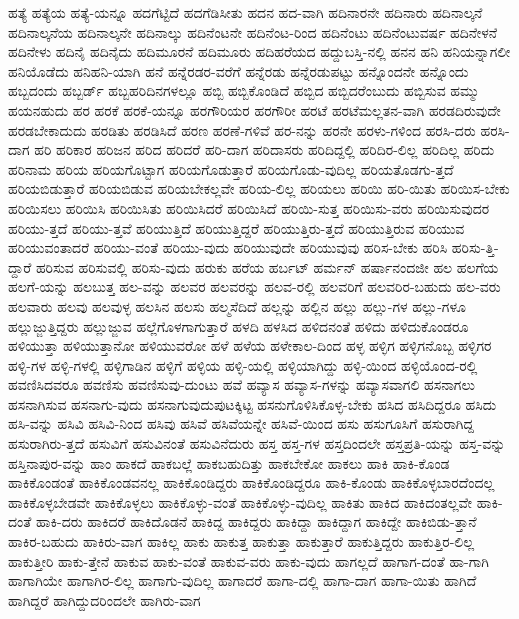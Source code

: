 {ಹತ್ಯೆ
ಹತ್ಯೆಯ
ಹತ್ಯೆ-ಯನ್ನೂ
ಹದಗೆಟ್ಟಿದೆ
ಹದಗೆಡಿಸೀತು
ಹದನ
ಹದ-ವಾಗಿ
ಹದಿನಾರನೇ
ಹದಿನಾರು
ಹದಿನಾಲ್ಕನೆ
ಹದಿನಾಲ್ಕನೆಯ
ಹದಿನಾಲ್ಕನೇ
ಹದಿನಾಲ್ಕು
ಹದಿನೆಂಟನೇ
ಹದಿನೆಂಟ-ರಿಂದ
ಹದಿನೆಂಟು
ಹದಿನೆಂಟುವರ್ಷ
ಹದಿನೇಳನೆ
ಹದಿನೇಳು
ಹದಿನೈ
ಹದಿನೈದು
ಹದಿಮೂರನೆ
ಹದಿಮೂರು
ಹದಿಹರೆಯದ
ಹದ್ದುಬಸ್ತಿ-ನಲ್ಲಿ
ಹನನ
ಹನಿ
ಹನಿಯನ್ನಾಗಲೀ
ಹನಿಯೊಡೆದು
ಹನಿಹನಿ-ಯಾಗಿ
ಹನೆ
ಹನ್ನೆರಡರ-ವರೆಗೆ
ಹನ್ನೆರಡು
ಹನ್ನೆರಡುಪಟ್ಟು
ಹನ್ನೊಂದನೇ
ಹನ್ನೊಂದು
ಹಬ್ಬದಂದು
ಹಬ್ಬರ್ಡ್
ಹಬ್ಬಹರಿದಿನಗಳಲ್ಲೂ
ಹಬ್ಬಿ
ಹಬ್ಬಿಕೊಂಡಿದೆ
ಹಬ್ಬಿದ
ಹಬ್ಬಿದರೆಂಬುದು
ಹಬ್ಬಿಸುವ
ಹಮ್ಮು
ಹಯನಹುದು
ಹರ
ಹರಕೆ
ಹರಕೆ-ಯನ್ನೂ
ಹರಗೌರಿಯರ
ಹರಗೌರೀ
ಹರಟೆ
ಹರಟೆಮಲ್ಲತನ-ವಾಗಿ
ಹರಡದಿರುವುದೇ
ಹರಡಬೇಕಾದುದು
ಹರಡಿತು
ಹರಡಿಸಿದೆ
ಹರಣ
ಹರಣೆ-ಗಳಿವೆ
ಹರ-ನನ್ನು
ಹರನೇ
ಹರಳು-ಗಳಿಂದ
ಹರಸಿ-ದರು
ಹರಸಿ-ದಾಗ
ಹರಿ
ಹರಿಕಾರ
ಹರಿಜನ
ಹರಿದ
ಹರಿದರೆ
ಹರಿ-ದಾಗ
ಹರಿದಾಸರು
ಹರಿದಿದ್ದಲ್ಲಿ
ಹರಿದಿರ-ಲಿಲ್ಲ
ಹರಿದಿಲ್ಲ
ಹರಿದು
ಹರಿನಾಮ
ಹರಿಯ
ಹರಿಯಗೊಟ್ಟಾಗ
ಹರಿಯಗೊಡುತ್ತಾರೆ
ಹರಿಯಗೊಡು-ವುದಿಲ್ಲ
ಹರಿಯತೊಡಗು-ತ್ತದೆ
ಹರಿಯಬಿಡುತ್ತಾರೆ
ಹರಿಯಬಿಡುವ
ಹರಿಯಬೇಕಲ್ಲವೇ
ಹರಿಯ-ಲಿಲ್ಲ
ಹರಿಯಲು
ಹರಿಯಿ
ಹರಿ-ಯಿತು
ಹರಿಯಿಸ-ಬೇಕು
ಹರಿಯಿಸಲು
ಹರಿಯಿಸಿ
ಹರಿಯಿಸಿತು
ಹರಿಯಿಸಿದರೆ
ಹರಿಯಿಸಿದೆ
ಹರಿಯಿ-ಸುತ್ತ
ಹರಿಯಿಸು-ವರು
ಹರಿಯಿಸುವುದರ
ಹರಿಯು-ತ್ತದೆ
ಹರಿಯು-ತ್ತವೆ
ಹರಿಯುತ್ತಿದೆ
ಹರಿಯುತ್ತಿದ್ದರೆ
ಹರಿಯುತ್ತಿರು-ತ್ತದೆ
ಹರಿಯುತ್ತಿರುವ
ಹರಿಯುವ
ಹರಿಯುವಂತಾದರೆ
ಹರಿಯು-ವಂತೆ
ಹರಿಯು-ವುದು
ಹರಿಯುವುದೇ
ಹರಿಯುವುವು
ಹರಿಸ-ಬೇಕು
ಹರಿಸಿ
ಹರಿಸು-ತ್ತಿ-ದ್ದಾರೆ
ಹರಿಸುವ
ಹರಿಸುವಲ್ಲಿ
ಹರಿಸು-ವುದು
ಹರುಕು
ಹರೆಯ
ಹರ್ಬಟ್
ಹರ್ಮನ್
ಹರ್ಷಾನಂದಜೀ
ಹಲ
ಹಲಗೆಯ
ಹಲಗೆ-ಯನ್ನು
ಹಲಬುತ್ತ
ಹಲ-ವನ್ನು
ಹಲವರ
ಹಲವರನ್ನು
ಹಲವ-ರಲ್ಲಿ
ಹಲವರಿಗೆ
ಹಲವರಿರ-ಬಹುದು
ಹಲ-ವರು
ಹಲವಾರು
ಹಲವು
ಹಲವುಳ್ಳ
ಹಲಸಿನ
ಹಲಸು
ಹಲ್ಮಸೆದಿದೆ
ಹಲ್ಲನ್ನು
ಹಲ್ಲಿನ
ಹಲ್ಲು
ಹಲ್ಲು-ಗಳ
ಹಲ್ಲು-ಗಳೂ
ಹಲ್ಲುಜ್ಜುತ್ತಿದ್ದರು
ಹಲ್ಲುಜ್ಜುವ
ಹಲ್ಲೆಗೊಳಗಾಗುತ್ತಾರೆ
ಹಳದಿ
ಹಳಸಿದ
ಹಳಿದನಂತೆ
ಹಳಿದು
ಹಳಿದುಕೊಂಡರೂ
ಹಳಿಯುತ್ತಾ
ಹಳಿಯುತ್ತಾನೋ
ಹಳಿಯುವರೋ
ಹಳೆ
ಹಳೆಯ
ಹಳೇಕಾಲ-ದಿಂದ
ಹಳ್ಳ
ಹಳ್ಳಿಗ
ಹಳ್ಳಿಗನೊಬ್ಬ
ಹಳ್ಳಿಗರ
ಹಳ್ಳಿ-ಗಳ
ಹಳ್ಳಿ-ಗಳಲ್ಲಿ
ಹಳ್ಳಿಗಾಡಿನ
ಹಳ್ಳಿಗೆ
ಹಳ್ಳಿಯ
ಹಳ್ಳಿ-ಯಲ್ಲಿ
ಹಳ್ಳಿಯಾಗಿದ್ದು
ಹಳ್ಳಿ-ಯಿಂದ
ಹಳ್ಳಿಯೊಂದ-ರಲ್ಲಿ
ಹವಣಿಸಿದವರೂ
ಹವಣಿಸು
ಹವಣಿಸುವು-ದುಂಟು
ಹವೆ
ಹವ್ಯಾಸ
ಹವ್ಯಾಸ-ಗಳನ್ನು
ಹವ್ಯಾಸವಾಗಲಿ
ಹಸನಾಗಲು
ಹಸನಾಗಿಸುವ
ಹಸನಾಗು-ವುದು
ಹಸನಾಗುವುದುಪುಟಕ್ಕಿಟ್ಟ
ಹಸನುಗೊಳಿಸಿಕೊಳ್ಳ-ಬೇಕು
ಹಸಿದ
ಹಸಿದಿದ್ದರೂ
ಹಸಿದು
ಹಸಿ-ವನ್ನು
ಹಸಿವಿ
ಹಸಿವಿ-ನಿಂದ
ಹಸಿವು
ಹಸಿವೆ
ಹಸಿವೆಯನ್ನೇ
ಹಸಿವೆ-ಯಿಂದ
ಹಸು
ಹಸುಗೂಸಿಗೆ
ಹಸುರಾಗಿದ್ದ
ಹಸುರಾಗಿರು-ತ್ತದೆ
ಹಸುವಿಗೆ
ಹಸುವಿನಂತೆ
ಹಸುವಿನೆದುರು
ಹಸ್ತ
ಹಸ್ತ-ಗಳ
ಹಸ್ತದಿಂದಲೇ
ಹಸ್ತಪ್ರತಿ-ಯನ್ನು
ಹಸ್ತ-ವನ್ನು
ಹಸ್ತಿನಾಪುರ-ವನ್ನು
ಹಾಂ
ಹಾಕದೆ
ಹಾಕಬಲ್ಲೆ
ಹಾಕಬಹುದಿತ್ತು
ಹಾಕಬೇಕೋ
ಹಾಕಲು
ಹಾಕಿ
ಹಾಕಿ-ಕೊಂಡ
ಹಾಕಿಕೊಂಡಂತೆ
ಹಾಕಿಕೊಂಡವನಲ್ಲ
ಹಾಕಿಕೊಂಡಿದ್ದರು
ಹಾಕಿಕೊಂಡಿದ್ದರೂ
ಹಾಕಿ-ಕೊಂಡು
ಹಾಕಿಕೊಳ್ಳಬಾರದೆಂದಲ್ಲ
ಹಾಕಿಕೊಳ್ಳಬೇಡವೇ
ಹಾಕಿಕೊಳ್ಳಲು
ಹಾಕಿಕೊಳ್ಳು-ವಂತೆ
ಹಾಕಿಕೊಳ್ಳು-ವುದಿಲ್ಲ
ಹಾಕಿತು
ಹಾಕಿದ
ಹಾಕಿದಂತಲ್ಲವೇ
ಹಾಕಿ-ದಂತೆ
ಹಾಕಿ-ದರು
ಹಾಕಿದರೆ
ಹಾಕಿದೊಡನೆ
ಹಾಕಿದ್ದ
ಹಾಕಿದ್ದರು
ಹಾಕಿದ್ದಾ
ಹಾಕಿದ್ದಾಗ
ಹಾಕಿದ್ದೇ
ಹಾಕಿಬಿಡು-ತ್ತಾನೆ
ಹಾಕಿರ-ಬಹುದು
ಹಾಕಿರು-ವಾಗ
ಹಾಕಿಲ್ಲ
ಹಾಕು
ಹಾಕುತ್ತ
ಹಾಕುತ್ತಾ
ಹಾಕುತ್ತಾರೆ
ಹಾಕುತ್ತಿದ್ದರು
ಹಾಕುತ್ತಿರ-ಲಿಲ್ಲ
ಹಾಕುತ್ತೀರಿ
ಹಾಕು-ತ್ತೇನೆ
ಹಾಕುವ
ಹಾಕು-ವಂತೆ
ಹಾಕುವ-ವರು
ಹಾಕು-ವುದು
ಹಾಗಲ್ಲದೆ
ಹಾಗಾಗ-ದಂತೆ
ಹಾ-ಗಾಗಿ
ಹಾಗಾಗಿಯೇ
ಹಾಗಾಗಿರ-ಲಿಲ್ಲ
ಹಾಗಾಗು-ವುದಿಲ್ಲ
ಹಾಗಾದರೆ
ಹಾಗಾ-ದಲ್ಲಿ
ಹಾಗಾ-ದಾಗ
ಹಾಗಾ-ಯಿತು
ಹಾಗಿದೆ
ಹಾಗಿದ್ದರೆ
ಹಾಗಿದ್ದುದರಿಂದಲೇ
ಹಾಗಿರು-ವಾಗ
}
